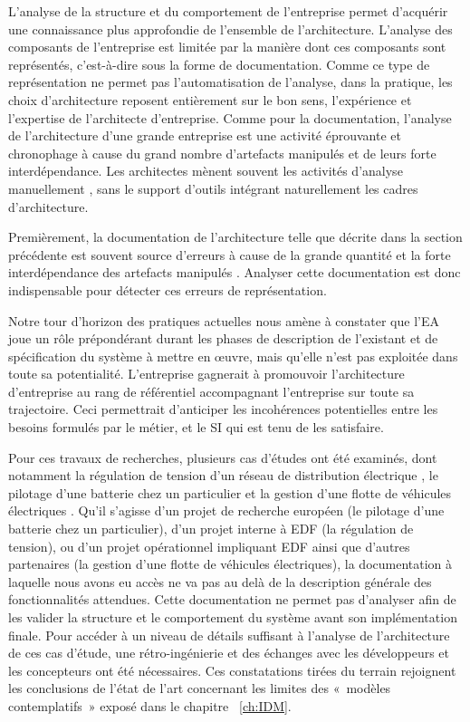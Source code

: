 L'analyse de la structure et du comportement de l'entreprise permet d'acquérir
une connaissance plus approfondie de l'ensemble de l'architecture. L'analyse des
composants de l'entreprise est limitée par la manière dont ces composants sont
représentés, c'est-à-dire sous la forme de documentation. Comme ce type de
représentation ne permet pas l'automatisation de l'analyse, dans la pratique,
les choix d'architecture reposent entièrement sur le bon sens, l'expérience et
l'expertise de l'architecte d'entreprise. Comme pour la documentation, l'analyse
de l'architecture d'une grande entreprise est une activité éprouvante et
chronophage à cause du grand nombre d'artefacts manipulés et de leurs forte
interdépendance. Les architectes mènent souvent les activités d'analyse
manuellement \cite{barn2013enterprise}, sans le support d'outils intégrant
naturellement les cadres d'architecture.

Premièrement, la documentation de l'architecture telle que décrite dans la
section précédente est souvent source d'erreurs à cause de la grande quantité
et la forte interdépendance des artefacts manipulés
\cite{kaisler_enterprise_2005}. Analyser cette documentation est donc
indispensable pour détecter ces erreurs de représentation.

Notre tour d'horizon des pratiques actuelles nous amène à constater que l'EA
joue un rôle prépondérant durant les phases de description de l'existant et de
spécification du système à mettre en œuvre, mais qu'elle n'est pas exploitée
dans toute sa potentialité. L'entreprise gagnerait à promouvoir l'architecture
d'entreprise au rang de référentiel accompagnant l'entreprise sur toute sa
trajectoire. Ceci permettrait d'anticiper les incohérences potentielles entre
les besoins formulés par le métier, et le SI qui est tenu de les satisfaire.

Pour ces travaux de recherches, plusieurs cas d'études ont été examinés, dont
notamment la régulation de tension d'un réseau de distribution électrique
\cite{seghiri2014simulation}, le pilotage d'une batterie chez un particulier
\cite{seghiri2012animation} et la gestion d'une flotte de véhicules électriques
\cite{seghiri2015simulation}. Qu'il s'agisse d'un projet de recherche européen
(le pilotage d'une batterie chez un particulier), d'un projet interne à EDF (la
régulation de tension), ou d'un projet opérationnel impliquant EDF ainsi que
d'autres partenaires (la gestion d'une flotte de véhicules électriques), la
documentation à laquelle nous avons eu accès ne va pas au delà de la
description générale des fonctionnalités attendues. Cette documentation ne
permet pas d'analyser afin de les valider la structure et le comportement du
système avant son implémentation finale. Pour accéder à un niveau de détails
suffisant à l'analyse de l'architecture de ces cas d'étude, une
rétro-ingénierie et des échanges avec les développeurs et les concepteurs ont
été nécessaires. Ces constatations tirées du terrain rejoignent les conclusions
de l'état de l'art concernant les limites des «~modèles contemplatifs~» exposé
dans le chapitre ~\ref{ch:IDM}.

